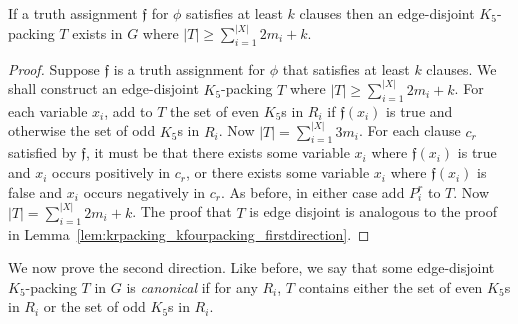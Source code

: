 \begin{lem}
\label{lem:krpacking_kfivepacking_firstdirection}
If a truth assignment $\mathfrak{f}$ for $\phi$ satisfies at least $k$ clauses then an edge-disjoint $K_5$-packing $T$ exists in $G$ where $|T| \geq \sum_{i=1}^{|X|} 2 m_i + k$.
\end{lem}
\begin{proof}
Suppose $\mathfrak{f}$ is a truth assignment for $\phi$ that satisfies at least $k$ clauses. We shall construct an edge-disjoint $K_5$-packing $T$ where $|T| \geq \sum_{i=1}^{|X|} 2 m_i + k$.
For each variable $x_i$, add to $T$ the set of even $K_5$s in $R_i$ if $\mathfrak{f}(x_i)$ is true and otherwise the set of odd $K_5$s in $R_i$. Now $|T|=\sum_{i=1}^{|X|} 3 m_i$.
For each clause $c_r$ satisfied by $\mathfrak{f}$, it must be that there exists some variable $x_i$ where $\mathfrak{f}(x_i)$ is true and $x_i$ occurs positively in $c_r$, or there exists some variable $x_i$ where $\mathfrak{f}(x_i)$ is false and $x_i$ occurs negatively in $c_r$. As before, in either case add $P_i^r$ to $T$. Now $|T| = \sum_{i=1}^{|X|} 2m_i + k$. The proof that $T$ is edge disjoint is analogous to the proof in Lemma~\ref{lem:krpacking_kfourpacking_firstdirection}.
\end{proof}


We now prove the second direction. Like before, we say that some edge-disjoint $K_5$-packing $T$ in $G$ is \emph{canonical} if for any $R_i$, $T$ contains either the set of even $K_5$s in $R_i$ or the set of odd $K_5$s in $R_i$.

